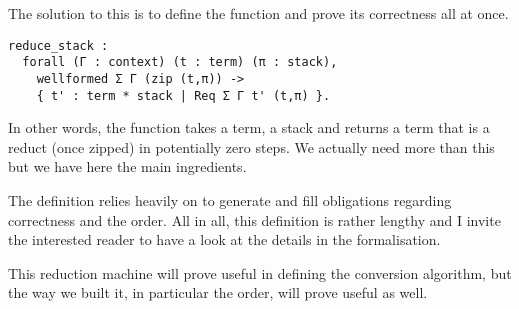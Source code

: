 The solution to this is to define the function and prove its correctness
all at once.
\begin{verbatim}
reduce_stack :
  forall (Γ : context) (t : term) (π : stack),
    wellformed Σ Γ (zip (t,π)) ->
    { t' : term * stack | Req Σ Γ t' (t,π) }.
\end{verbatim}
In other words, the function takes a term, a stack and returns a term that is
a reduct (once zipped) in potentially zero steps.
We actually need more than this but we have here the main ingredients.

The definition relies heavily on \Equations to generate and fill obligations
regarding correctness and the order.
All in all, this definition is rather lengthy and I invite the interested reader
to have a look at the details in the formalisation.

This reduction machine will prove useful in defining the conversion algorithm,
but the way we built it, in particular the order, will prove useful as well.